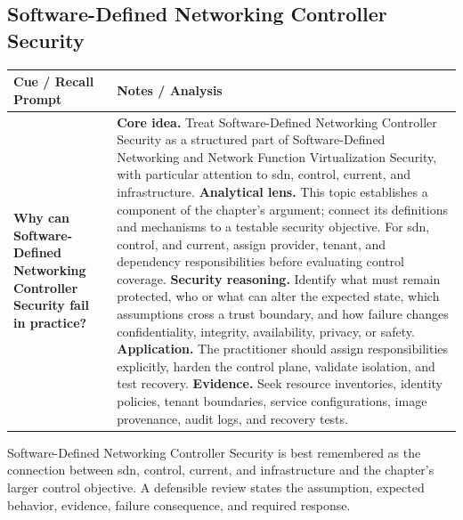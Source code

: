 \documentclass[11pt]{article}
\newcommand{\CornellHeader}{%
\rowcolor{Navy}\color{white}\bfseries Cue / Recall Prompt & \color{white}\bfseries Notes / Analysis\\\hline}
\newcommand{\CornellRow}[2]{%
\cellcolor{CueGray}\RaggedRight\textbf{#1} & \RaggedRight #2\\\hline}
\begin{document}
\subsection*{Software-Defined Networking Controller Security}
\begin{longtable}{>{\RaggedRight\arraybackslash}p{}|>{\RaggedRight\arraybackslash}p{}}
\CornellHeader
\CornellRow{Why can Software-Defined Networking Controller Security fail in practice?}{\textbf{Core idea.} Treat Software-Defined Networking Controller Security as a structured part of Software-Defined Networking and Network Function Virtualization Security, with particular attention to sdn, control, current, and infrastructure. \textbf{Analytical lens.} This topic establishes a component of the chapter's argument; connect its definitions and mechanisms to a testable security objective. For sdn, control, and current, assign provider, tenant, and dependency responsibilities before evaluating control coverage. \textbf{Security reasoning.} Identify what must remain protected, who or what can alter the expected state, which assumptions cross a trust boundary, and how failure changes confidentiality, integrity, availability, privacy, or safety. \textbf{Application.} The practitioner should assign responsibilities explicitly, harden the control plane, validate isolation, and test recovery. \textbf{Evidence.} Seek resource inventories, identity policies, tenant boundaries, service configurations, image provenance, audit logs, and recovery tests.}
\end{longtable}
\begin{topicsummary}
Software-Defined Networking Controller Security is best remembered as the connection between sdn, control, current, and infrastructure and the chapter's larger control objective. A defensible review states the assumption, expected behavior, evidence, failure consequence, and required response.
\end{topicsummary}
\end{document}
